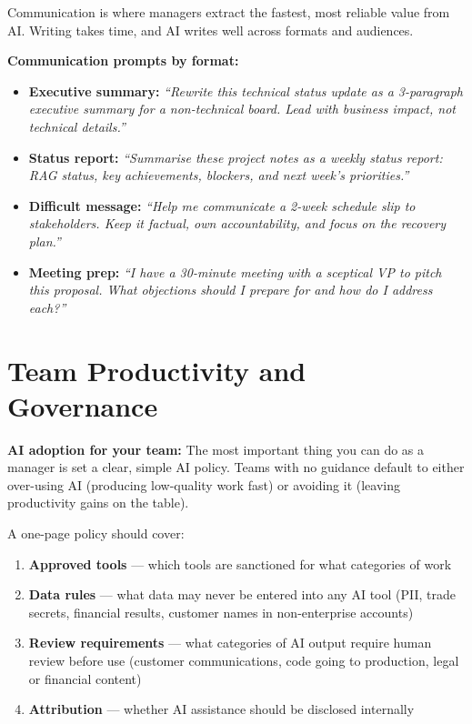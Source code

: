 Communication is where managers extract the fastest, most reliable value from AI.
Writing takes time, and AI writes well across formats and audiences.

\textbf{Communication prompts by format:}
\begin{itemize}
  \item \textbf{Executive summary:}
    \textit{``Rewrite this technical status update as a 3-paragraph executive summary for a non-technical board. Lead with business impact, not technical details.''}
  \item \textbf{Status report:}
    \textit{``Summarise these project notes as a weekly status report: RAG status, key achievements, blockers, and next week's priorities.''}
  \item \textbf{Difficult message:}
    \textit{``Help me communicate a 2-week schedule slip to stakeholders. Keep it factual, own accountability, and focus on the recovery plan.''}
  \item \textbf{Meeting prep:}
    \textit{``I have a 30-minute meeting with a sceptical VP to pitch this proposal. What objections should I prepare for and how do I address each?''}
\end{itemize}

\section{Team Productivity and Governance}
\label{sec:team-productivity}

\textbf{AI adoption for your team:}
The most important thing you can do as a manager is set a clear, simple AI policy.
Teams with no guidance default to either over-using AI (producing low-quality work fast)
or avoiding it (leaving productivity gains on the table).

A one-page policy should cover:
\begin{enumerate}
  \item \textbf{Approved tools} --- which tools are sanctioned for what categories of work
  \item \textbf{Data rules} --- what data may never be entered into any AI tool (PII, trade
        secrets, financial results, customer names in non-enterprise accounts)
  \item \textbf{Review requirements} --- what categories of AI output require human review
        before use (customer communications, code going to production, legal or financial
        content)
  \item \textbf{Attribution} --- whether AI assistance should be disclosed internally
\end{enumerate}

